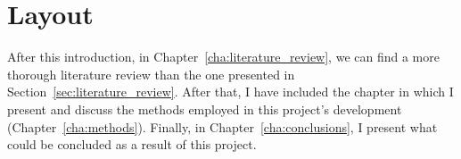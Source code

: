 

\section{Layout}%
\label{sec:layout}

After this introduction, in Chapter~\ref{cha:literature_review}, we can
find a more thorough literature review than the one presented in
Section~\ref{sec:literature_review}. After that, I have included the
chapter in which I present and discuss the methods employed in this
project's development (Chapter~\ref{cha:methods}). Finally, in
Chapter~\ref{cha:conclusions}, I present what could be concluded as a
result of this project.
